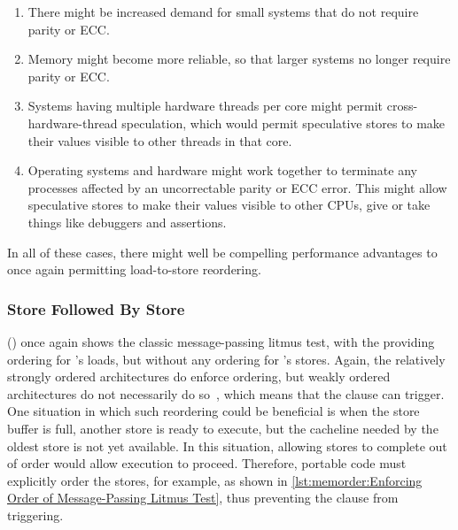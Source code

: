{	\begin{enumerate}
	\item	There might be increased demand for small systems that
		do not require parity or ECC.
	\item	Memory might become more reliable, so that larger systems
		no longer require parity or ECC.
	\item	Systems having multiple hardware threads per core might
		permit cross-hardware-thread speculation, which would
		permit speculative stores to make their values visible
		to other threads in that core.
	\item	Operating systems and hardware might work together to
		terminate any processes affected by an uncorrectable
		parity or ECC error.
		This might allow speculative stores to make their
		values visible to other CPUs, give or take things
		like debuggers and assertions.
	\end{enumerate}

	In all of these cases, there might well be compelling performance
	advantages to once again permitting load-to-store reordering.
}\QuickQuizEnd

\begin{listing}

\caption{Message-Passing Litmus Test, No Writer Ordering (No Ordering)}
\label{lst:memorder:Message-Passing Litmus Test; No Writer Ordering (No Ordering)}
\end{listing}

\subsubsection{Store Followed By Store}
\label{sec:memorder:Store Followed By Store}

()
once again shows the classic message-passing litmus test, with the
 providing ordering for 's loads, but without
any ordering for 's stores.
Again, the relatively strongly ordered architectures do enforce ordering,
but weakly ordered architectures do not necessarily do
so~\cite{JadeAlglave2011ppcmem}, which means that the
 clause can trigger.
One situation in which such reordering could be beneficial is when
the store buffer is full, another store is ready to execute, but the
cacheline needed by the oldest store is not yet available.
In this situation, allowing stores to complete out of order would
allow execution to proceed.
Therefore, portable code must explicitly order the stores, for
example, as shown in
\cref{lst:memorder:Enforcing Order of Message-Passing Litmus Test},
thus preventing the  clause from triggering.


